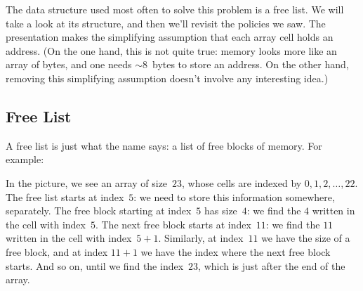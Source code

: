 The data structure used most often to solve this problem is a free list.
We will take a look at its structure, and then we'll revisit the policies we saw.
The presentation makes the simplifying assumption
  that each array cell holds an address.
(On the one hand, this is not quite true:
  memory looks more like an array of bytes,
  and one needs $\sim8$~bytes to store an address.
On the other hand,
  removing this simplifying assumption doesn't involve any interesting idea.)

\subsection{Free List}

A free list is just what the name says:
  a list of free blocks of memory.
For example:
\begin{center}
\end{center}
In the picture, we see an array of size~$23$,
  whose cells are indexed by $0,1,2,\ldots,22$.
The free list starts at index~$5$:
  we need to store this information somewhere, separately.
The free block starting at index~$5$ has size~$4$:
  we find the $4$ written in the cell with index~$5$.
The next free block starts at index~$11$:
  we find the $11$ written in the cell with index~$5+1$.
Similarly, at index~$11$ we have the size of a free block,
  and at index $11+1$ we have the index where the next free block starts.
And so on, until we find the index~$23$,
  which is just after the end of the array.

